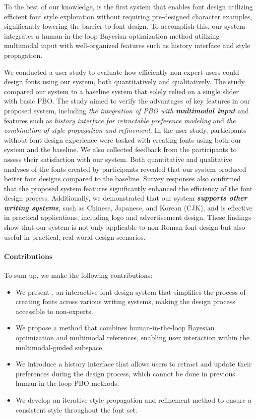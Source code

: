 To the best of our knowledge, \systemName is the first system that enables font design utilizing efficient font style exploration without requiring pre-designed character examples, significantly lowering the barrier to font design.
To accomplish this, our system integrates a human-in-the-loop Bayesian optimization method utilizing multimodal input with well-organized features such as history interface and style propagation.

We conducted a user study to evaluate how efficiently non-expert users could design fonts using our system, both quantitatively and qualitatively.
The study compared our system to a baseline system that solely relied on a single slider with basic PBO.
The study aimed to verify the advantages of key features in our proposed system, including \textit{the integration of PBO with \textbf{multimodal input}} and features such as \textit{history interface for retractable preference modeling} and \textit{the combination of style propagation and refinement}.
In the user study, participants without font design experience were tasked with creating fonts using both our system and the baseline.
We also collected feedback from the participants to assess their satisfaction with our system.
Both quantitative and qualitative analyses of the fonts created by participants revealed that our system produced better font designs compared to the baseline.
Survey responses also confirmed that the proposed system features significantly enhanced the efficiency of the font design process.
Additionally, we demonstrated that our system \emph{\textbf{supports other writing systems}}, such as Chinese, Japanese, and Korean (CJK), and is effective in practical applications, including logo and advertisement design.
These findings show that our system is not only applicable to non-Roman font design but also useful in practical, real-world design scenarios.

\paragraph{Contributions}
To sum up, we make the following contributions:
\begin{itemize}[leftmargin=0.5cm]
    \item We present \systemName, an interactive font design system that simplifies the process of creating fonts across various writing systems, making the design process accessible to non-experts.
    \item We propose a method that combines human-in-the-loop Bayesian optimization and multimodal references, enabling user interaction within the multimodal-guided subspace.
    \item We introduce a history interface that allows users to retract and update their preferences during the design process, which cannot be done in previous human-in-the-loop PBO methods.
    \item We develop an iterative style propagation and refinement method to ensure a consistent style throughout the font set.
\end{itemize}
